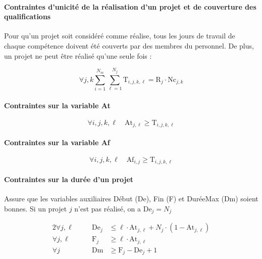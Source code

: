 \documentclass[12pt, a4paper, english, version=last, parskip=half, titlepage]{scrartcl}
\begin{document}

\paragraph{Contraintes d’unicité de la réalisation d’un projet et de couverture des qualifications}
Pour qu'un projet soit considéré comme réalise, tous les jours de travail de chaque compétence doivent été couverts par des membres du personnel. De plus, un projet ne peut être réalisé qu'une seule fois :

\begin{equation*}
    \forall j,k \sum_{i=1}^{N_m} \sum_{\ell=1}^{N_j} \text{T}_{i,j,k,\ell} = \text{R}_{j}\cdot\text{Nc}_{j,k}
\end{equation*}

\paragraph{Contraintes sur la variable At}
\begin{equation*}
    \forall i,j,k,\ell \quad \text{At}_{j,\ell} \ge \text{T}_{i,j,k,\ell}
\end{equation*}

\paragraph{Contraintes sur la variable Af}
\begin{equation*}
    \forall i,j,k,\ell \quad \text{Af}_{i,j} \ge \text{T}_{i,j,k,\ell}
\end{equation*}

\paragraph{Contraintes sur la durée d'un projet}
Assure que les variables auxiliaires Début (De), Fin (F) et DuréeMax (Dm) soient bonnes.
Si un projet $j$ n'est pas réalisé, on a $\text{De}_j = N_j$ %

\begin{alignat*}{2}
    \forall j,\ell \quad&& \text{De}_j  &\le \ell \cdot \text{At}_{j,\ell} + N_j \cdot (1-\text{At}_{j,\ell}) \\
    \forall j,\ell \quad&& \text{F}_j    &\ge \ell \cdot \text{At}_{j,\ell} \\
    \forall j      \quad&& \text{Dm} &\ge \text{F}_j - \text{De}_j + 1
\end{alignat*}
\end{document}
